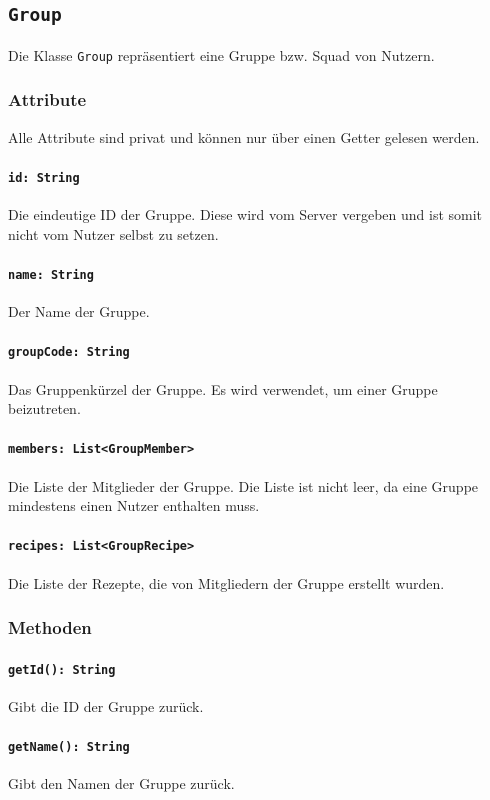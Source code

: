 \documentclass{entwurfsheft}
\begin{document}
\subsection{\texttt{Group}}\label{sec:group}
Die Klasse \texttt{Group} repräsentiert eine Gruppe bzw. Squad von Nutzern.
\subsubsection*{Attribute}
Alle Attribute sind privat und können nur über einen Getter gelesen werden.
\paragraph{\texttt{id: String}}
Die eindeutige ID der Gruppe. Diese wird vom Server vergeben und ist somit nicht vom Nutzer selbst zu setzen.
\paragraph{\texttt{name: String}}
Der Name der Gruppe.
\paragraph{\texttt{groupCode: String}}
Das Gruppenkürzel der Gruppe. Es wird verwendet, um einer Gruppe beizutreten.
\paragraph{\texttt{members: List<GroupMember>}}
Die Liste der Mitglieder der Gruppe. Die Liste ist nicht leer, da eine Gruppe mindestens einen Nutzer enthalten muss.
\paragraph{\texttt{recipes: List<GroupRecipe>}}
Die Liste der Rezepte, die von Mitgliedern der Gruppe erstellt wurden.

\subsubsection*{Methoden}
\paragraph{\texttt{getId(): String}}
Gibt die ID der Gruppe zurück.
\paragraph{\texttt{getName(): String}}
Gibt den Namen der Gruppe zurück.
\end{document}
